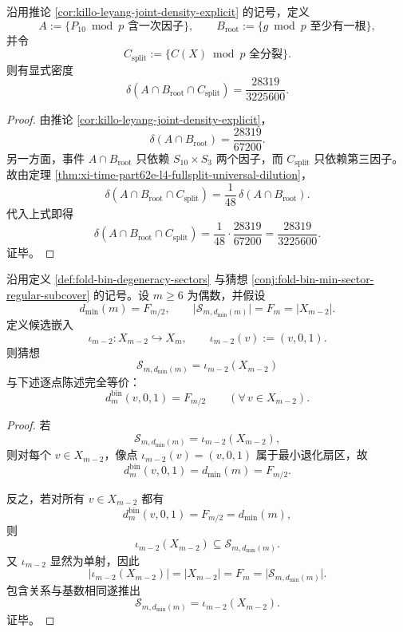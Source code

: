 \begin{corollary}[三域混合事件的显式密度闭式]\label{cor:xi-time-part64a-triple-mixed-event-explicit-density}
沿用推论 \ref{cor:killo-leyang-joint-density-explicit} 的记号，定义
\[
A:=\{\text{\(P_{10}\bmod p\) 含一次因子}\},
\qquad
B_{\mathrm{root}}:=\{\text{\(g\bmod p\) 至少有一根}\},
\]
并令
\[
C_{\mathrm{split}}:=\{\text{\(C(X)\bmod p\) 全分裂}\}.
\]
则有显式密度
\[
\delta(A\cap B_{\mathrm{root}}\cap C_{\mathrm{split}})
=
\frac{28319}{3225600}.
\]
\end{corollary}
\begin{proof}
由推论 \ref{cor:killo-leyang-joint-density-explicit}，
\[
\delta(A\cap B_{\mathrm{root}})=\frac{28319}{67200}.
\]
另一方面，事件 \(A\cap B_{\mathrm{root}}\) 只依赖 \(S_{10}\times S_3\) 两个因子，而
\(C_{\mathrm{split}}\) 只依赖第三因子。故由定理
\ref{thm:xi-time-part62e-l4-fullsplit-universal-dilution}，
\[
\delta(A\cap B_{\mathrm{root}}\cap C_{\mathrm{split}})
=
\frac{1}{48}\,\delta(A\cap B_{\mathrm{root}}).
\]
代入上式即得
\[
\delta(A\cap B_{\mathrm{root}}\cap C_{\mathrm{split}})
=
\frac{1}{48}\cdot \frac{28319}{67200}
=
\frac{28319}{3225600}.
\]
证毕。
\end{proof}

\begin{proposition}[最小退化扇区猜想的逐点等价判据]\label{prop:xi-time-part64a-minsector-pointwise-equivalence}
沿用定义 \ref{def:fold-bin-degeneracy-sectors} 与猜想
\ref{conj:fold-bin-min-sector-regular-subcover} 的记号。设 \(m\ge 6\) 为偶数，并假设
\[
d_{\min}(m)=F_{m/2},
\qquad
\bigl|\mathcal S_{m,d_{\min}(m)}\bigr|=F_m=|X_{m-2}|.
\]
定义候选嵌入
\[
\iota_{m-2}:X_{m-2}\hookrightarrow X_m,
\qquad
\iota_{m-2}(v):=(v,0,1).
\]
则猜想
\[
\mathcal S_{m,d_{\min}(m)}=\iota_{m-2}(X_{m-2})
\]
与下述逐点陈述完全等价：
\[
d_m^{\mathrm{bin}}(v,0,1)=F_{m/2}
\qquad
(\forall\,v\in X_{m-2}).
\]
\end{proposition}
\begin{proof}
若
\[
\mathcal S_{m,d_{\min}(m)}=\iota_{m-2}(X_{m-2}),
\]
则对每个 \(v\in X_{m-2}\)，像点 \(\iota_{m-2}(v)=(v,0,1)\) 属于最小退化扇区，故
\[
d_m^{\mathrm{bin}}(v,0,1)=d_{\min}(m)=F_{m/2}.
\]

反之，若对所有 \(v\in X_{m-2}\) 都有
\[
d_m^{\mathrm{bin}}(v,0,1)=F_{m/2}=d_{\min}(m),
\]
则
\[
\iota_{m-2}(X_{m-2})\subseteq \mathcal S_{m,d_{\min}(m)}.
\]
又 \(\iota_{m-2}\) 显然为单射，因此
\[
\bigl|\iota_{m-2}(X_{m-2})\bigr|
=
|X_{m-2}|
=
F_m
=
\bigl|\mathcal S_{m,d_{\min}(m)}\bigr|.
\]
包含关系与基数相同遂推出
\[
\mathcal S_{m,d_{\min}(m)}=\iota_{m-2}(X_{m-2}).
\]
证毕。
\end{proof}

